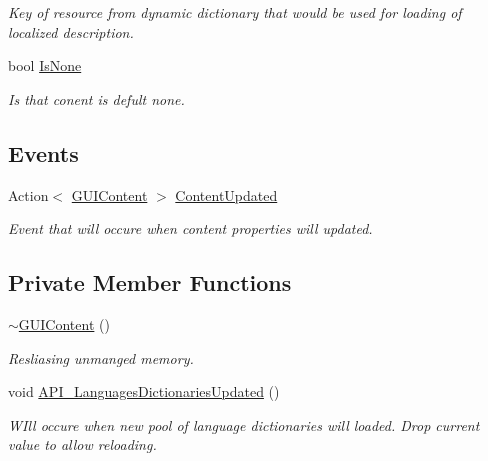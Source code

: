 \begin{DoxyCompactItemize}
\begin{DoxyCompactList}\small\item\em Key of resource from dynamic dictionary that would be used for loading of localized description. \end{DoxyCompactList}\item 
bool \mbox{\hyperlink{class_wpf_handler_1_1_u_i_1_1_g_u_i_content_ab8044a6651911a3b52f47b4cc6c485cd}{Is\+None}}
\begin{DoxyCompactList}\small\item\em Is that conent is defult none. \end{DoxyCompactList}\end{DoxyCompactItemize}
\subsection*{Events}
\begin{DoxyCompactItemize}
\item 
Action$<$ \mbox{\hyperlink{class_wpf_handler_1_1_u_i_1_1_g_u_i_content}{G\+U\+I\+Content}} $>$ \mbox{\hyperlink{class_wpf_handler_1_1_u_i_1_1_g_u_i_content_a165b9cf266e359c62f576b07ee9865ad}{Content\+Updated}}
\begin{DoxyCompactList}\small\item\em Event that will occure when content properties will updated. \end{DoxyCompactList}\end{DoxyCompactItemize}
\subsection*{Private Member Functions}
\begin{DoxyCompactItemize}
\item 
\mbox{\hyperlink{class_wpf_handler_1_1_u_i_1_1_g_u_i_content_a6bd38c606c795603ab17e2d6acfec72f}{$\sim$\+G\+U\+I\+Content}} ()
\begin{DoxyCompactList}\small\item\em Resliasing unmanged memory. \end{DoxyCompactList}\item 
void \mbox{\hyperlink{class_wpf_handler_1_1_u_i_1_1_g_u_i_content_a05536bbfc1d91f3c2db9bea9ae2dc468}{A\+P\+I\+\_\+\+Languages\+Dictionaries\+Updated}} ()
\begin{DoxyCompactList}\small\item\em W\+Ill occure when new pool of language dictionaries will loaded. Drop current value to allow reloading. \end{DoxyCompactList}\end{DoxyCompactItemize}
